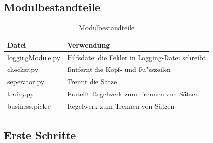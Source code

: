 \documentclass[12pt]{scrartcl}
\begin{document}
\subsection{Modulbestandteile}
\label{sec:modulbestandteile}
\begin{table}[H]
\centering
\label{modulbestandteil}
\begin{tabular}{|l|l|}
\hline
\rowcolor[HTML]{9B9B9B} 
Datei                & Verwendung                                 \\ \hline
loggingModule.py           & Hilfsdatei die Fehler in Logging-Datei schreibt        \\ \hline
checker.py           & Entfernt die Kopf- und Fu"sszeilen         \\ \hline
seperator.py         & Trennt die Sätze                           \\ \hline
trainy.py            & Erstellt Regelwerk zum Trennen von Sätzen  \\ \hline
business.pickle      & Regelwerk zum Trennen von Sätzen           \\ \hline
\end{tabular}
\caption{Modulbestandteile}
\end{table}
\newpage
\subsection{Erste Schritte}
\label{sec:first-steps}
\end{document}
